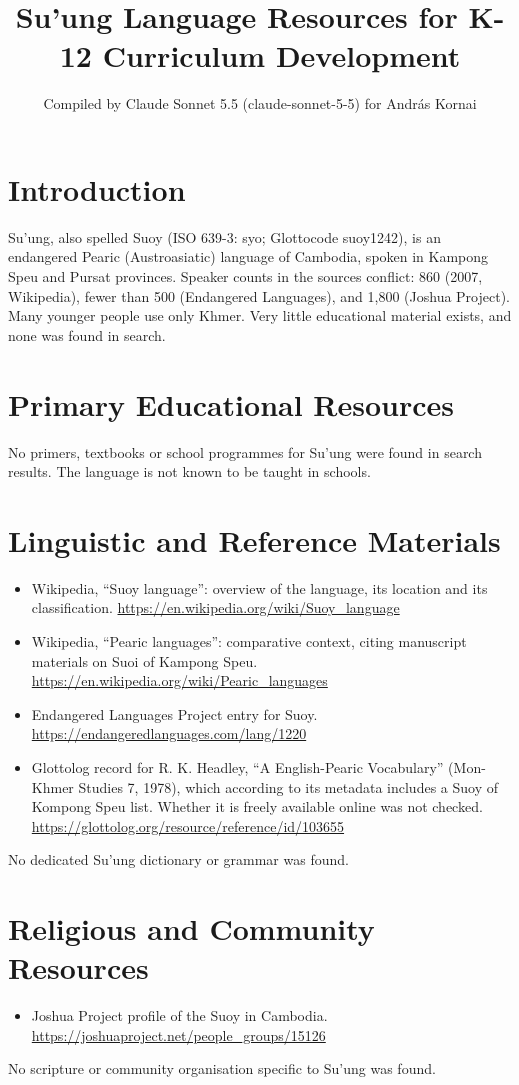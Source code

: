 \documentclass[12pt]{article}
\title{Su'ung Language Resources for K-12 Curriculum Development}
\author{Compiled by Claude Sonnet 5.5 (claude-sonnet-5-5) for Andr\'as Kornai}
\date{}
\begin{document}
\maketitle

\section{Introduction}
Su'ung, also spelled Suoy (ISO 639-3: syo; Glottocode suoy1242), is an endangered Pearic (Austroasiatic) language of Cambodia, spoken in Kampong Speu and Pursat provinces. Speaker counts in the sources conflict: 860 (2007, Wikipedia), fewer than 500 (Endangered Languages), and 1,800 (Joshua Project). Many younger people use only Khmer. Very little educational material exists, and none was found in search.

\section{Primary Educational Resources}
No primers, textbooks or school programmes for Su'ung were found in search results. The language is not known to be taught in schools.

\section{Linguistic and Reference Materials}
\begin{itemize}
\item Wikipedia, ``Suoy language'': overview of the language, its location and its classification. \url{https://en.wikipedia.org/wiki/Suoy_language}
\item Wikipedia, ``Pearic languages'': comparative context, citing manuscript materials on Suoi of Kampong Speu. \url{https://en.wikipedia.org/wiki/Pearic_languages}
\item Endangered Languages Project entry for Suoy. \url{https://endangeredlanguages.com/lang/1220}
\item Glottolog record for R. K. Headley, ``A English-Pearic Vocabulary'' (Mon-Khmer Studies 7, 1978), which according to its metadata includes a Suoy of Kompong Speu list. Whether it is freely available online was not checked. \url{https://glottolog.org/resource/reference/id/103655}
\end{itemize}
No dedicated Su'ung dictionary or grammar was found.

\section{Religious and Community Resources}
\begin{itemize}
\item Joshua Project profile of the Suoy in Cambodia. \url{https://joshuaproject.net/people_groups/15126}
\end{itemize}
No scripture or community organisation specific to Su'ung was found.
\end{document}
